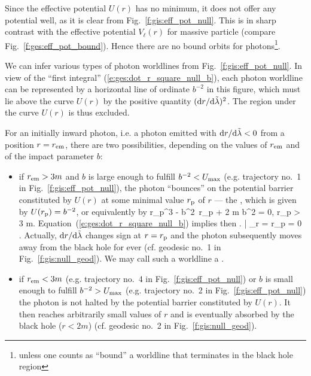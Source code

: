 Since the effective potential
$U(r)$ has no minimum, it does not offer any potential well,
as it is clear from Fig.~\ref{f:gis:eff_pot_null}. This is in sharp contrast
with the effective potential $V_\ell(r)$ for massive particle
(compare Fig.~\ref{f:ges:eff_pot_bound}). Hence there are no bound orbits
for photons\footnote{unless one counts as ``bound'' a worldline that terminates in the
black hole region}.

We can infer various types of photon worldlines from Fig.~\ref{f:gis:eff_pot_null}.
In view of the ``first integral'' (\ref{e:ges:dot_r_square_null_b}),
each photon worldline can be represented by a horizontal line of ordinate
$b^{-2}$ in this figure, which must lie above the curve $U(r)$
by the positive quantity $({\mathrm{d} r}/{\mathrm{d}\tilde{\lambda}})^2$. The region under the curve
$U(r)$ is thus excluded.

For an initially inward photon, i.e. a photon emitted with ${\mathrm{d} r}/{\mathrm{d}\tilde{\lambda}} < 0$
from a position $r=r_{\rm em}$, there are
two possibilities, depending on the values of $r_{\rm em}$ and
of the impact parameter $b$:
\begin{itemize}
\item if $r_{\rm em} > 3 m$ and $b$ is large enough to fulfill $b^{-2} < U_{\rm max}$
(e.g. trajectory no.~1 in Fig.~\ref{f:gis:eff_pot_null}), the photon
``bounces'' on the potential barrier constituted by $U(r)$
at some minimal value  $r_{\rm p}$ of $r$ --- the ,
which is given by  $U(r_{\rm p}) = b^{-2}$, or equivalently by
\be \label{e:ges:r_per_null}
  r_{\rm p}^3 - b^2\, r_{\rm p} + 2 m b^2 = 0, \quad r_{\rm p} > 3 m.
\ee
Equation~(\ref{e:ges:dot_r_square_null_b})
implies then
\be
    \left.  \right| _{r = r_{\rm p}} = 0 .
\ee
Actually, $\mathrm{d} r / \mathrm{d}\tilde{\lambda}$ changes sign at $r = r_{\rm p}$ and
the photon subsequently moves away from the black hole for ever (cf. geodesic
no.~1 in Fig.~\ref{f:gis:null_geod}). We may call
such a worldline a .
\item if $r_{\rm em} < 3 m$ (e.g. trajectory
no.~4 in Fig.~\ref{f:gis:eff_pot_null}) or $b$ is small enough to fulfill $b^{-2} > U_{\rm max}$ (e.g. trajectory
no.~2 in Fig.~\ref{f:gis:eff_pot_null}) the photon
is not halted by the potential barrier constituted by $U(r)$. It then reaches arbitrarily
small values of $r$ and is eventually absorbed by the black hole ($r < 2m$)
(cf. geodesic no.~2 in Fig.~\ref{f:gis:null_geod}).
\end{itemize}


